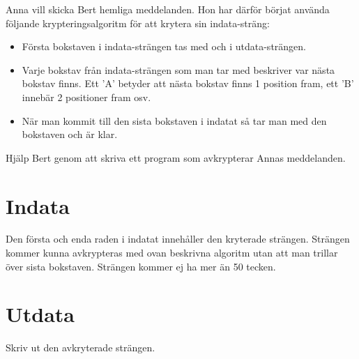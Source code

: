 
Anna vill skicka Bert hemliga meddelanden.  Hon har därför börjat använda följande krypteringsalgoritm för att krytera sin indata-sträng:

\begin{itemize}
	\item Första bokstaven i indata-strängen tas med och i utdata-strängen.
	\item Varje bokstav från indata-strängen som man tar med beskriver var nästa bokstav finns. Ett 'A' betyder att nästa bokstav finns 1 position fram, ett 'B' innebär 2 positioner fram osv.
	\item När man kommit till den sista bokstaven i indatat så tar man med den bokstaven och är klar.
\end{itemize}

Hjälp Bert genom att skriva ett program som avkrypterar Annas meddelanden.

\section*{Indata}

Den första och enda raden i indatat innehåller den kryterade strängen. Strängen
kommer kunna avkrypteras med ovan beskrivna algoritm utan att man trillar över
sista bokstaven. Strängen kommer ej ha mer än 50 tecken.

\section*{Utdata}

Skriv ut den avkryterade strängen.
